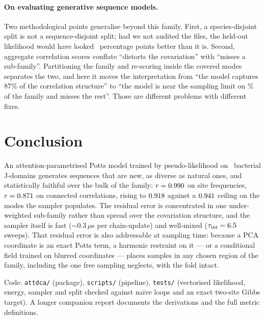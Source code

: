 \documentclass[10pt,twocolumn,a4paper]{article}
\begin{document}
\paragraph{On evaluating generative sequence models.} Two methodological points generalise beyond
this family. First, a species-disjoint split is not a sequence-disjoint split; had we not audited
the files, the held-out likelihood would have looked \NLPLgapPct\ percentage points better than it
is. Second, aggregate correlation scores conflate ``distorts the covariation'' with ``misses a
sub-family''. Partitioning the family and re-scoring inside the covered modes separates the two,
and here it moves the interpretation from ``the model captures 87\% of the correlation structure''
to ``the model is near the sampling limit on \CovWeight\% of the family and misses the rest''.
Those are different problems with different fixes.

\section{Conclusion}
An attention-parametrised Potts model trained by pseudo-likelihood on \Mtrain\ bacterial
J-domains generates sequences that are new, as diverse as natural ones, and statistically
faithful over the bulk of the family: $r=0.990$ on site frequencies, $r=0.871$ on connected
correlations, rising to $0.918$ against a $0.941$ ceiling on the modes the sampler
populates. The residual error is concentrated in one under-weighted sub-family rather than spread
over the covariation structure, and the sampler itself is fast (${\sim}0.3\,\mu$s per
chain-update) and well-mixed ($\tau_\text{int}=6.5$ sweeps). That residual error is also
addressable at sampling time: because a PCA coordinate is an exact Potts term, a harmonic restraint
on it --- or a conditional field trained on blurred coordinates --- places samples in any chosen
region of the family, including the one free sampling neglects, with the fold intact.

\vspace{0.3cm}
\noindent\small
Code: \texttt{attdca/} (package), \texttt{scripts/} (pipeline), \texttt{tests/} (vectorised
likelihood, energy, sampler and split checked against naive loops and an exact two-site Gibbs
target). A longer companion report documents the derivations and the full metric definitions.
\end{document}
